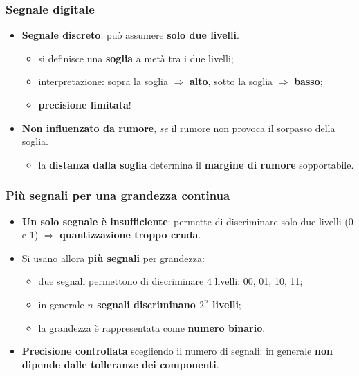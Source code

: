 \documentclass[12pt, a4paper]{article}
\begin{document}
\subsubsection{Segnale digitale}
\begin{itemize}
    \item \textcolor{blue!70!black}{\textbf{Segnale discreto}}: può assumere \textbf{solo due livelli}.
    \begin{itemize}
        \item si definisce una \textbf{soglia} a metà tra i due livelli;
        \item interpretazione: sopra la soglia $\Rightarrow$ \textbf{alto}, sotto la soglia $\Rightarrow$ \textbf{basso};
        \item \textbf{precisione limitata}!
    \end{itemize}
    \item \textcolor{green!50!black}{\textbf{Non influenzato da rumore}}, \emph{se} il rumore non provoca il sorpasso della soglia.
    \begin{itemize}
        \item la \textbf{distanza dalla soglia} determina il \textbf{margine di rumore} sopportabile.
    \end{itemize}
\end{itemize}

\subsubsection{Più segnali per una grandezza continua}
\begin{itemize}
    \item \textbf{Un solo segnale è insufficiente}: permette di discriminare solo due livelli (0 e 1) $\Rightarrow$ \textbf{quantizzazione troppo cruda}.
    \item Si usano allora \textcolor{red!80!black}{\textbf{più segnali}} per grandezza:
    \begin{itemize}
        \item due segnali permettono di discriminare 4 livelli: 00, 01, 10, 11;
        \item in generale \textbf{$n$ segnali discriminano $2^n$ livelli};
        \item la grandezza è rappresentata come \textbf{numero binario}.
    \end{itemize}
    \item \textbf{Precisione controllata} scegliendo il numero di segnali: in generale \textbf{non dipende dalle tolleranze dei componenti}.
\end{itemize}
\end{document}
